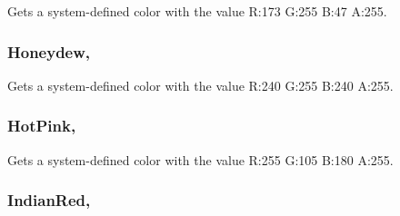 Gets a system-\/defined color with the value R\+:173 G\+:255 B\+:47 A\+:255.

\hypertarget{structMicrosoft_1_1Xna_1_1Framework_1_1Color_a046d4bed6a500f5322d1d9c791f0f703}{}
\subsubsection[{Honeydew}]{ Honeydew\hspace{0.3cm}{\ttfamily [static]}, {\ttfamily [get]}}\label{structMicrosoft_1_1Xna_1_1Framework_1_1Color_a046d4bed6a500f5322d1d9c791f0f703}


Gets a system-\/defined color with the value R\+:240 G\+:255 B\+:240 A\+:255.

\hypertarget{structMicrosoft_1_1Xna_1_1Framework_1_1Color_a7ea3ebc430cda6473c6099d11bd91783}{}
\subsubsection[{Hot\+Pink}]{ Hot\+Pink\hspace{0.3cm}{\ttfamily [static]}, {\ttfamily [get]}}\label{structMicrosoft_1_1Xna_1_1Framework_1_1Color_a7ea3ebc430cda6473c6099d11bd91783}


Gets a system-\/defined color with the value R\+:255 G\+:105 B\+:180 A\+:255.

\hypertarget{structMicrosoft_1_1Xna_1_1Framework_1_1Color_ac255c4c0e21eda9a7c7880fcaea4050f}{}
\subsubsection[{Indian\+Red}]{ Indian\+Red\hspace{0.3cm}{\ttfamily [static]}, {\ttfamily [get]}}\label{structMicrosoft_1_1Xna_1_1Framework_1_1Color_ac255c4c0e21eda9a7c7880fcaea4050f}


